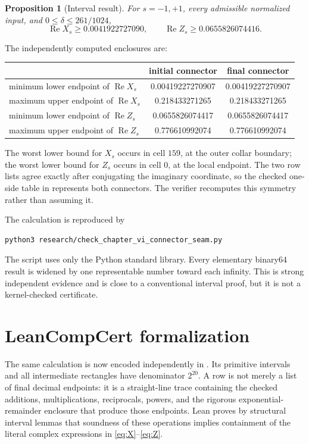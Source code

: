 \documentclass[11pt]{article}
\newtheorem{proposition}[theorem]{Proposition}
\newcommand{\re}{\operatorname{Re}}
\begin{document}
\begin{proposition}[Interval result]\label{prop:interval}
For \(s=-1,+1\), every admissible normalized input, and
\(0\leq\delta\leq261/1024\),
\[
 \re X_s\geq0.0041922727090,\qquad
 \re Z_s\geq0.0655826074416.
\]
\end{proposition}

The independently computed enclosures are:
\begin{center}
\begin{tabular}{lcc}
\toprule
 & initial connector & final connector\\
\midrule
minimum lower endpoint of \(\re X_s\) & 0.00419227270907 & 0.00419227270907\\
maximum upper endpoint of \(\re X_s\) & 0.218433271265 & 0.218433271265\\
minimum lower endpoint of \(\re Z_s\) & 0.0655826074417 & 0.0655826074417\\
maximum upper endpoint of \(\re Z_s\) & 0.776610992074 & 0.776610992074\\
\bottomrule
\end{tabular}
\end{center}
The worst lower bound for \(X_s\) occurs in cell \(159\), at the outer collar boundary;
the worst lower bound for \(Z_s\) occurs in cell \(0\), at the local endpoint.
The two row lists agree exactly after conjugating the imaginary coordinate, so the checked
one-side table in  represents both
connectors. The verifier recomputes this symmetry rather than assuming it.

The calculation is reproduced by
\begin{verbatim}
python3 research/check_chapter_vi_connector_seam.py
\end{verbatim}
The script uses only the Python standard library. Every elementary binary64 result is widened
by one representable number toward each infinity. This is strong independent evidence and is
close to a conventional interval proof, but it is not a kernel-checked certificate.

\section{LeanCompCert formalization}

The same calculation is now encoded independently in
.  Its primitive intervals and all intermediate
rectangles have denominator $2^{20}$.  A row is not merely a list of final decimal endpoints: it
is a straight-line trace containing the checked additions, multiplications, reciprocals, powers,
and the rigorous exponential-remainder enclosure that produce those endpoints.  Lean proves by
structural interval lemmas that soundness of these operations implies containment of the literal
complex expressions in \eqref{eq:X}--\eqref{eq:Z}.
\end{document}
